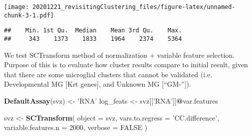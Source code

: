 \documentclass[
]{article}
\newenvironment{Shaded}{\begin{snugshade}}{\end{snugshade}}
\newcommand{\DataTypeTok}[1]{\textcolor[rgb]{0.13,0.29,0.53}{#1}}
\newcommand{\DecValTok}[1]{\textcolor[rgb]{0.00,0.00,0.81}{#1}}
\newcommand{\KeywordTok}[1]{\textcolor[rgb]{0.13,0.29,0.53}{\textbf{#1}}}
\newcommand{\NormalTok}[1]{#1}
\newcommand{\OperatorTok}[1]{\textcolor[rgb]{0.81,0.36,0.00}{\textbf{#1}}}
\newcommand{\OtherTok}[1]{\textcolor[rgb]{0.56,0.35,0.01}{#1}}
\newcommand{\StringTok}[1]{\textcolor[rgb]{0.31,0.60,0.02}{#1}}
\begin{document}
\texttt{[image: 20201221\_revisitingClustering\_files/figure-latex/unnamed-chunk-3-1.pdf]}

\begin{Shaded}
\end{Shaded}

\begin{verbatim}
##    Min. 1st Qu.  Median    Mean 3rd Qu.    Max. 
##     343    1373    1833    1964    2374    5364
\end{verbatim}

We test SCTransform method of normalization + variable feature
selection. Purpose of this is to evaluate how cluster results compare to
initial result, given that there are some microglial clusters that
cannot be validated (i.e. Developmental MG {[}Krt genes{]}, and Unknown
MG {[}``GM-''{]}).

\begin{Shaded}
\begin{Highlighting}[]
\KeywordTok{DefaultAssay}\NormalTok{(svz) <-}\StringTok{ 'RNA'}
\NormalTok{log_feats <-}\StringTok{ }\NormalTok{svz[[}\StringTok{'RNA'}\NormalTok{]]}\OperatorTok{@}\NormalTok{var.features}

\NormalTok{svz <-}\StringTok{ }\KeywordTok{SCTransform}\NormalTok{(}
  \DataTypeTok{object =}\NormalTok{ svz, }
  \DataTypeTok{vars.to.regress =} \StringTok{'CC.difference'}\NormalTok{,}
  \DataTypeTok{variable.features.n =} \DecValTok{2000}\NormalTok{,}
  \DataTypeTok{verbose =} \OtherTok{FALSE}
\NormalTok{)}
\end{Highlighting}
\end{Shaded}
\end{document}
